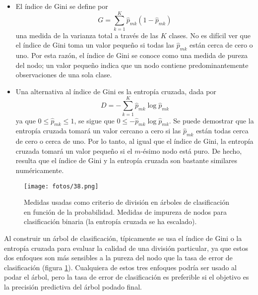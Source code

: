 \begin{itemize}
\item El índice de Gini se define por
\begin{equation}
G = \sum_{k=1}^{K} \hat{p}_{mk}(1 - \hat{p}_{mk})
\end{equation}
una medida de la varianza total a través de las $K$ clases. No es difícil ver que el índice de Gini toma un valor pequeño si todas las $\hat{p}_{mk}$ están cerca de cero o uno. Por esta razón, el índice de Gini se conoce como una medida de pureza del nodo; un valor pequeño indica que un nodo contiene predominantemente observaciones de una sola clase.
\item Una alternativa al índice de Gini es la entropía cruzada, dada por 
\begin{equation}
D = -\sum_{k=1}^{K} \hat{p}_{mk} \log \hat{p}_{mk}
\end{equation}
ya que $0 \leq \hat{p}_{mk} \leq 1$, se sigue que $0 \leq -\hat{p}_{mk} \log \hat{p}_{mk}$. Se puede demostrar que
la entropía cruzada tomará un valor cercano a cero si las $\hat{p}_{mk}$ están todas cerca de cero o cerca de uno. Por lo tanto, al igual que el índice de Gini, la entropía cruzada tomará un valor pequeño si el $m$-ésimo nodo está puro. De hecho, resulta que el índice de Gini y la entropía cruzada son bastante similares numéricamente.
\end{itemize}

\begin{figure}[h]
\centering
\texttt{[image: fotos/38.png]}
\caption{Medidas usadas como criterio de división en árboles de clasificación en función de la probabilidad. Medidas de impureza de nodos para clasificación binaria (la entropía cruzada se ha escalado).}
\label{fig:6.66}
\end{figure}

Al construir un árbol de clasificación, típicamente se usa el índice de Gini o la entropía cruzada para evaluar la calidad de una división particular, ya que estos dos enfoques son más sensibles a la pureza del nodo que la tasa de error de clasificación (figura \ref{fig:6.66}). Cualquiera de estos tres enfoques podría ser usado al podar el árbol, pero la tasa de error de clasificación es preferible si el objetivo es la precisión predictiva del árbol podado final. \\

